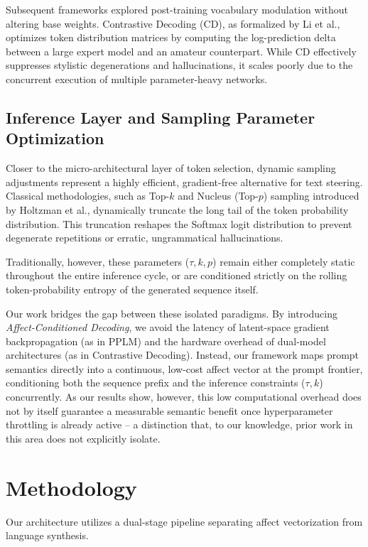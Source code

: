 \documentclass[10pt,twocolumn]{article}
\begin{document}
Subsequent frameworks explored post-training vocabulary modulation without altering base weights. Contrastive Decoding (CD), as formalized by Li et al., optimizes token distribution matrices by computing the log-prediction delta between a large expert model and an amateur counterpart. While CD effectively suppresses stylistic degenerations and hallucinations, it scales poorly due to the concurrent execution of multiple parameter-heavy networks.

\subsection{Inference Layer and Sampling Parameter Optimization}
Closer to the micro-architectural layer of token selection, dynamic sampling adjustments represent a highly efficient, gradient-free alternative for text steering. Classical methodologies, such as Top-$k$ and Nucleus (Top-$p$) sampling introduced by Holtzman et al., dynamically truncate the long tail of the token probability distribution. This truncation reshapes the Softmax logit distribution to prevent degenerate repetitions or erratic, ungrammatical hallucinations.

Traditionally, however, these parameters ($\tau, k, p$) remain either completely static throughout the entire inference cycle, or are conditioned strictly on the rolling token-probability entropy of the generated sequence itself.

Our work bridges the gap between these isolated paradigms. By introducing \textit{Affect-Conditioned Decoding}, we avoid the latency of latent-space gradient backpropagation (as in PPLM) and the hardware overhead of dual-model architectures (as in Contrastive Decoding). Instead, our framework maps prompt semantics directly into a continuous, low-cost affect vector at the prompt frontier, conditioning both the sequence prefix and the inference constraints ($\tau, k$) concurrently. As our results show, however, this low computational overhead does not by itself guarantee a measurable semantic benefit once hyperparameter throttling is already active -- a distinction that, to our knowledge, prior work in this area does not explicitly isolate.


\section{Methodology}
Our architecture utilizes a dual-stage pipeline separating affect vectorization from language synthesis.
\end{document}
